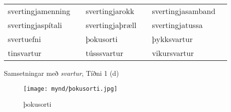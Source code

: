\documentclass[../samsetningasafn.tex]{subfiles}
\begin{document}
\begin{wordlist}[H]
\begin{tcolorbox}
	\setlength{\extrarowheight}{3pt}
	\begin{tabular}{BlBlBl}	
		svertingjamenning	& 	\phantom{ba} 	& 
		svertingjarokk		&	\phantom{ba} 	& 
		svertingjasamband	&	\phantom{ba} 	\\ 
		svertingjaspítali	&		& 
		svertingjaþræll		&		& 
		svertingjatussa	&		\\ 
		svertuefni		& 		& 
		þokusorti			&		& 
		þykksvartur		& 		\\ 
		tinsvartur			&		& 
		tússsvartur		&		& 
		vikursvartur		& 		 
	\end{tabular}
\end{tcolorbox}
	\caption{Samsetningar með \textit{svartur}, Tíðni 1 (d)}
	\label{listi:svart.1d}
\end{wordlist}	

\begin{figure}[H]
\begin{tcolorbox}
\centering
	\texttt{[image: mynd/þokusorti.jpg]}
\end{tcolorbox}
	\caption{þokusorti}
	\label{mynd:þokusorti}
\end{figure}
\end{document}
